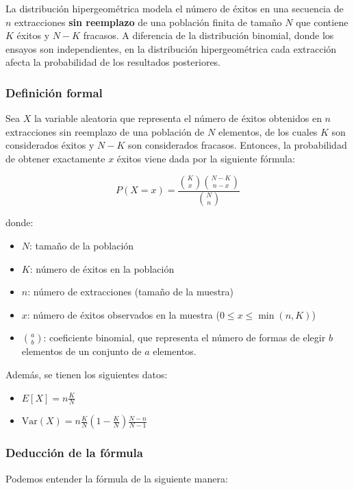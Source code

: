 \documentclass[letterpaper, 12pt]{article}
\begin{document}
	La distribución hipergeométrica modela el número de éxitos en una secuencia de $n$ extracciones \textbf{sin reemplazo} de una población finita de tamaño $N$ que contiene $K$ éxitos y $N-K$ fracasos. A diferencia de la distribución binomial, donde los ensayos son independientes, en la distribución hipergeométrica cada extracción afecta la probabilidad de los resultados posteriores.
	
	\subsubsection{Definición formal}
	
	Sea $X$ la variable aleatoria que representa el número de éxitos obtenidos en $n$ extracciones sin reemplazo de una población de $N$ elementos, de los cuales $K$ son considerados éxitos y $N-K$ son considerados fracasos. Entonces, la probabilidad de obtener exactamente $x$ éxitos viene dada por la siguiente fórmula:
	
	$$
	P(X=x) = \frac{\binom{K}{x} \binom{N-K}{n-x}}{\binom{N}{n}}
	$$
	
	donde:
	\begin{itemize}
		\item $N$: tamaño de la población
		\item $K$: número de éxitos en la población
		\item $n$: número de extracciones (tamaño de la muestra)
		\item $x$: número de éxitos observados en la muestra ($0 \le x \le \min(n, K)$)
		\item $\binom{a}{b}$: coeficiente binomial, que representa el número de formas de elegir $b$ elementos de un conjunto de $a$ elementos.
	\end{itemize}
	
	Además, se tienen los siguientes datos:
	\begin{itemize}
		\item $E[X] = n \frac{K}{N}$
		\item $\text{Var}(X) = n \frac{K}{N} \left(1 - \frac{K}{N}\right) \frac{N-n}{N-1}$
	\end{itemize}
	
	\subsubsection{Deducción de la fórmula}
	
	Podemos entender la fórmula de la siguiente manera:
	
\end{document}

